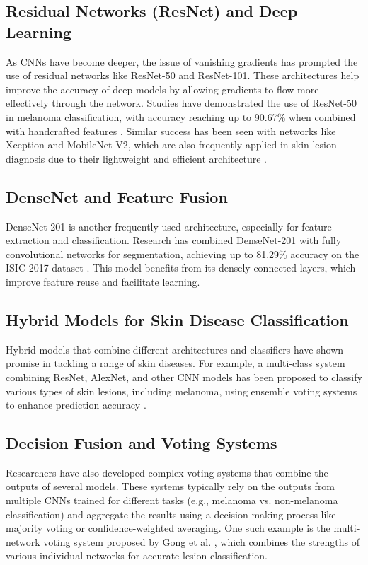 \documentclass{article}
\begin{document}
\subsection{Residual Networks (ResNet) and Deep Learning}
As CNNs have become deeper, the issue of vanishing gradients has prompted the use of residual networks like ResNet-50 and ResNet-101. These architectures help improve the accuracy of deep models by allowing gradients to flow more effectively through the network. Studies have demonstrated the use of ResNet-50 in melanoma classification, with accuracy reaching up to 90.67\% when combined with handcrafted features \cite{Almaraz-Damian2020}. Similar success has been seen with networks like Xception and MobileNet-V2, which are also frequently applied in skin lesion diagnosis due to their lightweight and efficient architecture \cite{Almaraz-Damian2020}.

\subsection{DenseNet and Feature Fusion}
DenseNet-201 is another frequently used architecture, especially for feature extraction and classification. Research has combined DenseNet-201 with fully convolutional networks for segmentation, achieving up to 81.29\% accuracy on the ISIC 2017 dataset \cite{Al-masni2020}. This model benefits from its densely connected layers, which improve feature reuse and facilitate learning.

\subsection{Hybrid Models for Skin Disease Classification}
Hybrid models that combine different architectures and classifiers have shown promise in tackling a range of skin diseases. For example, a multi-class system combining ResNet, AlexNet, and other CNN models has been proposed to classify various types of skin lesions, including melanoma, using ensemble voting systems to enhance prediction accuracy \cite{Ichim2020}.

\subsection{Decision Fusion and Voting Systems}
Researchers have also developed complex voting systems that combine the outputs of several models. These systems typically rely on the outputs from multiple CNNs trained for different tasks (e.g., melanoma vs. non-melanoma classification) and aggregate the results using a decision-making process like majority voting or confidence-weighted averaging. One such example is the multi-network voting system proposed by Gong et al. \cite{Gong2020}, which combines the strengths of various individual networks for accurate lesion classification.
\end{document}
